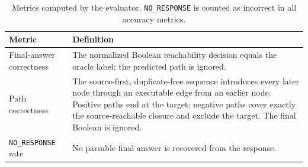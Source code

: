 \begin{table}[t]
\centering
\caption{Metrics computed by the evaluator. \texttt{NO\_RESPONSE} is counted as incorrect in all accuracy metrics.}
\label{tab:metrics}
\small
\begin{tabularx}{\textwidth}{p{}X}
\toprule
Metric & Definition \\
\midrule
Final-answer correctness & The normalized Boolean reachability decision equals the oracle label; the predicted path is ignored. \\
Path correctness & The source-first, duplicate-free sequence introduces every later node through an executable edge from an earlier node. Positive paths end at the target; negative paths cover exactly the source-reachable closure and exclude the target. The final Boolean is ignored. \\
\texttt{NO\_RESPONSE} rate & No parsable final answer is recovered from the response. \\
\bottomrule
\end{tabularx}
\end{table}
